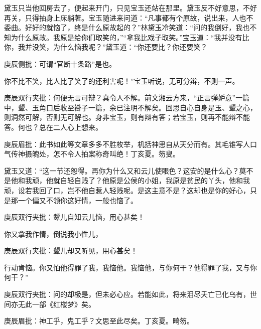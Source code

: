 \begin{parag}
    黛玉只当他回房去了，便起来开门，只见宝玉还站在那里。黛玉反不好意思，不好再关，只得抽身上床躺著。宝玉随进来问道：“凡事都有个原故，说出来，人也不委曲。好好的就恼了，终是什么原故起的？”林黛玉冷笑道：“问的我倒好，我也不知为什么原故。我原是给你们取笑的，”“拿我比戏子取笑。”宝玉道：“我并没有比你，我并没笑，为什么恼我呢？”黛玉道：“你还要比？你还要笑？\begin{note}庚辰侧批：可谓“官断十条路”是也。\end{note}你不比不笑，比人比了笑了的还利害呢！”宝玉听说，无可分辩，不则一声。\begin{note}庚辰双行夹批：何便无言可辩？真令人不解。前文湘云方来，“正言弹妒意”一篇中，颦、玉角口后收至褂子一篇，余已注明不解矣。回思自心自身是玉、颦之心，则洞然可解，否则无可解也。身非宝玉，则有辩有答；若宝玉，则再不能辩不能答。何也？总在二人心上想来。\end{note}\begin{note}庚辰眉批：此书如此等文章多多不胜枚举，机括神思自从天分而有。其毛锥写人口气传神摄魄处，怎不令人拍案称奇叫绝！丁亥夏。笏叟。\end{note}
\end{parag}


\begin{parag}
    黛玉又道：“这一节还恕得。再你为什么又和云儿使眼色？这安的是什么心？莫不是他和我顽，他就自轻自贱了？他原是公侯的小姐，我原是贫民的丫头，他和我顽，设若我回了口，岂不他自惹人轻贱呢。是这主意不是？这却也是你的好心，只是那一个偏又不领你这好情，一般也恼了。\begin{note}庚辰双行夹批：颦儿自知云儿恼，用心甚矣！\end{note}你又拿我作情，倒说我小性儿，\begin{note}庚辰双行夹批：颦儿却又听见，用心甚矣！\end{note}行动肯恼。你又怕他得罪了我，我恼他。我恼他，与你何干？他得罪了我，又与你何干？”\begin{note}庚辰双行夹批：问的却极是，但未必心应。若能如此，将来泪尽夭亡已化乌有，世间亦无此一部《红楼梦》矣。\end{note}\begin{note}庚辰眉批：神工乎，鬼工乎？文思至此尽矣。丁亥夏。畸笏。\end{note}
\end{parag}


